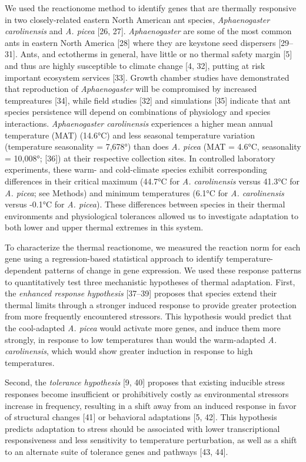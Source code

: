 \documentclass[]{article}
\begin{document}
We used the reactionome method to identify genes that are thermally
responsive in two closely-related eastern North American ant species,
\emph{Aphaenogaster carolinensis} and \emph{A. picea} {[}26, 27{]}.
\emph{Aphaenogaster} are some of the most common ants in eastern North
America {[}28{]} where they are keystone seed dispersers {[}29--31{]}.
Ants, and ectotherms in general, have little or no thermal safety margin
{[}5{]} and thus are highly susceptible to climate change {[}4, 32{]},
putting at risk important ecosystem services {[}33{]}. Growth chamber
studies have demonstrated that reproduction of \emph{Aphaenogaster} will
be compromised by increased tempreatures {[}34{]}, while field studies
{[}32{]} and simulations {[}35{]} indicate that ant species persistence
will depend on combinations of physiology and species interactions.
\emph{Aphaenogaster carolinensis} experiences a higher mean annual
temperature (MAT) (14.6°C) and less seasonal temperature variation
(temperature seasonality = 7,678°) than does \emph{A. picea} (MAT =
4.6°C, seasonality = 10,008°; {[}36{]}) at their respective collection
sites. In controlled laboratory experiments, these warm- and
cold-climate species exhibit corresponding differences in their critical
maximum (44.7°C for \emph{A. carolinensis} versus 41.3°C for \emph{A.
picea}; see Methods) and minimum temperatures (6.1°C for \emph{A.
carolinensis} versus -0.1°C for \emph{A. picea}). These differences
between species in their thermal environments and physiological
tolerances allowed us to investigate adaptation to both lower and upper
thermal extremes in this system.

To characterize the thermal reactionome, we measured the reaction norm
for each gene using a regression-based statistical approach to identify
temperature-dependent patterns of change in gene expression. We used
these response patterns to quantitatively test three mechanistic
hypotheses of thermal adaptation. First, the \emph{enhanced response
hypothesis} {[}37--39{]} proposes that species extend their thermal
limits through a stronger induced response to provide greater protection
from more frequently encountered stressors. This hypothesis would
predict that the cool-adapted \emph{A. picea} would activate more genes,
and induce them more strongly, in response to low temperatures than
would the warm-adapted \emph{A. carolinensis}, which would show greater
induction in response to high temperatures.

Second, the \emph{tolerance hypothesis} {[}9, 40{]} proposes that
existing inducible stress responses become insufficient or prohibitively
costly as environmental stressors increase in frequency, resulting in a
shift away from an induced response in favor of structural changes
{[}41{]} or behavioral adaptations {[}5, 42{]}. This hypothesis predicts
adaptation to stress should be associated with lower transcriptional
responsiveness and less sensitivity to temperature perturbation, as well
as a shift to an alternate suite of tolerance genes and pathways {[}43,
44{]}.
\end{document}
